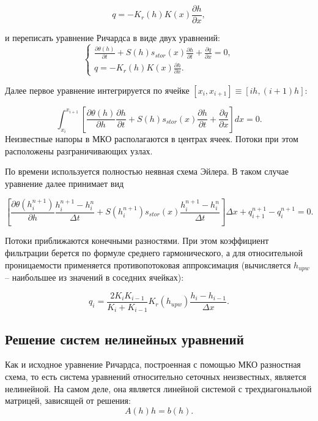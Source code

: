 \documentclass[a4paper,12pt]{article}
\begin{document}
\begin{equation}
	q = -K_r(h)		K(x)\frac{\partial h}{\partial x},
\end{equation}

и переписать уравнение Ричардса в виде двух уравнений:
\begin{equation}
	\begin{cases}
			\frac{\partial \theta(h)}{\partial t} + S(h)
		s_{stor}(x)\frac{\partial h}{\partial t} + \frac{\partial q}{\partial x} = 0,\\
		q = -K_r(h)		K(x)\frac{\partial h}{\partial x}.
	\end{cases}
\end{equation}

Далее первое уравнение интегрируется по ячейке $[x_i, x_{i+1}] \equiv [ih, (i+1)h]$:

\begin{equation}
	\int_{x_i}^{x_{i+1}}\left[ \frac{\partial \theta(h)}{\partial h}
	\frac{\partial h}{\partial t} + S(h)s_{stor}(x)\frac{\partial h}{\partial t}
	+
	\frac{\partial q}{\partial x}
	\right]dx = 0.
\end{equation}
 Неизвестные напоры в МКО располагаются в центрах ячеек. Потоки при этом расположены разграничивающих узлах.
 
 По времени используется полностью неявная схема Эйлера. В таком случае уравнение далее принимает вид 
 
 \begin{equation}
 	\left[ \frac{\partial \theta(h^{n+1}_i)}{\partial h}
 	\frac{h_i^{n+1} - h_i^{n}}{\Delta t} + S(h_i^{n+1})s_{stor}(x)\frac{h_i^{n+1} - h_i^n}{\Delta t}
 	\right]\Delta x
 	+
 	q_{i+1}^{n+1} - q_i^{n+1} = 0.
 \end{equation}
 
 Потоки приближаются конечными разностями. При этом коэффициент фильтрации берется по формуле среднего гармонического, а для относительной проницаемости применяется противопотоковая аппроксимация (вычисляется $h_{upw}$ -- наибольшее из значений в соседних ячейках):
 
 \begin{equation}
 	q_i = \frac{2K_iK_{i-1}}{K_i + K_{i-1}}K_r(h_{upw})\frac{h_i - h_{i-1}}{\Delta x}.
 \end{equation}
 
 \subsection{Решение систем нелинейных уравнений}
 Как и исходное уравнение Ричардса, построенная с помощью МКО разностная схема, то есть система уравнений относительно сеточных неизвестных, является нелинейной. На самом деле, она является линейной системой с трехдиагональной матрицей, зависящей от решения:
 \begin{equation}
 	A(h)h = b(h).
 \end{equation}
 
\end{document}
